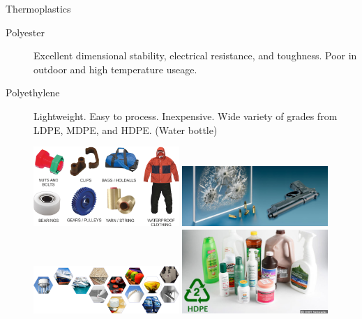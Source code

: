 \documentclass[10pt, svgnames]{beamer}
\begin{document}
\begin{frame}[label={sec:org58c806f}]{Thermoplastics}
\begin{description}
\item[{Polyester}] Excellent dimensional stability, electrical resistance, and toughness. Poor in outdoor and high temperature useage.
\item[{Polyethylene}] Lightweight. Easy to process. Inexpensive. Wide variety of grades from LDPE, MDPE, and HDPE. (Water bottle)

\centering
\includegraphics[width=0.45\textwidth]{pictures/nylon}
\includegraphics[width=0.45\textwidth]{pictures/polycarbonate} \\\empty
\includegraphics[width=0.45\textwidth]{pictures/polyester}
\includegraphics[width=0.45\textwidth]{pictures/HDPE}
\end{description}
\end{frame}
\end{document}
